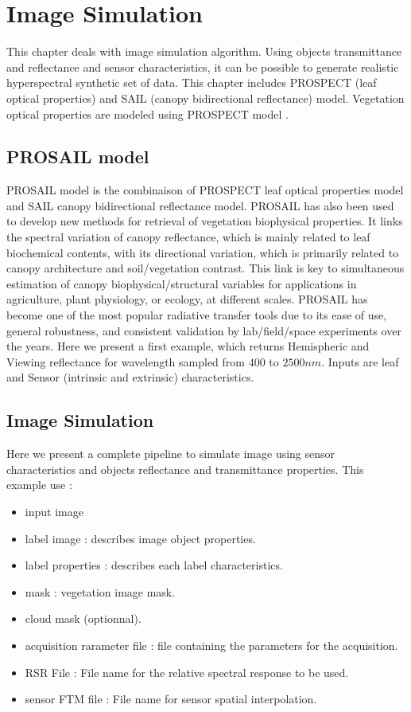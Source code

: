 \chapter{Image Simulation}

This chapter deals with image simulation algorithm. Using objects transmittance and reflectance and sensor characteristics, it can be possible to generate realistic hyperspectral synthetic set of data. This chapter includes PROSPECT (leaf optical properties) and SAIL (canopy bidirectional reflectance) model. Vegetation optical properties are modeled using PROSPECT model \cite{Jacquemoud2009}. 

\section{PROSAIL model}

PROSAIL \cite{Jacquemoud2009} model is the combinaison of PROSPECT leaf optical properties model and SAIL canopy bidirectional reflectance model. PROSAIL has also been used to develop new methods for retrieval of vegetation biophysical properties. It links the spectral variation of canopy reflectance, which is mainly related to leaf biochemical contents, with its directional variation, which is primarily related to canopy architecture and soil/vegetation contrast. This link is key to simultaneous estimation of canopy biophysical/structural variables for applications in agriculture, plant physiology, or ecology, at different scales. PROSAIL has become one of the most popular radiative transfer tools due to its ease of use, general robustness, and consistent validation by lab/field/space experiments over the years. Here we present a first example, which returns Hemispheric and Viewing reflectance for wavelength sampled  from $400$ to $2500 nm$. Inputs are leaf and Sensor (intrinsic and extrinsic) characteristics. 

\label{sec:Prosail}



\section{Image Simulation}

Here we present a complete pipeline to simulate image using sensor characteristics and objects reflectance and transmittance properties. This example use :

\begin{itemize}
\item input image
\item label image : describes image object properties.
\item label properties : describes each label characteristics.
\item mask : vegetation image mask.
\item cloud mask (optionnal).
\item acquisition rarameter file : file containing the parameters for the acquisition.
\item RSR File : File name for the relative spectral response to be used.
\item sensor FTM file : File name for sensor spatial interpolation.
\end{itemize}

